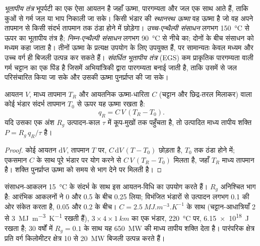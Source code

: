 \begin{definition}[भूतापीय तंत्र, स्थानस्थ ऊष्मा, एन्थैल्पी वर्ग, EGS]\label{def:b2:energy-geology:geothermal}
\emph{भूतापीय तंत्र} भूपर्पटी का एक ऐसा आयतन है जहाँ ऊष्मा,
पारगम्यता और जल एक साथ आते हैं, ताकि कुओं से गर्म जल या भाप निकाली जा सके। किसी भंडार की
\emph{स्थानस्थ ऊष्मा} वह ऊष्मा है जो वह अपने तापमान से किसी संदर्भ तापमान तक ठंडा होने
में छोड़ेगा। \emph{उच्च-एन्थैल्पी संसाधन}
लगभग \qty{150}{\celsius} से ऊपर का भूतापीय तंत्र है; \emph{निम्न-एन्थैल्पी
संसाधन} लगभग \qty{90}{\celsius} से नीचे का; दोनों के बीच
संसाधन को मध्यम कहा जाता है। तीनों ऊष्मा के प्रत्यक्ष उपयोग के लिए उपयुक्त हैं, पर सामान्यतः केवल मध्यम
और उच्च वर्ग ही बिजली उत्पन्न कर सकते हैं। \emph{संवर्धित भूतापीय तंत्र} (EGS)
कम प्राकृतिक पारगम्यता वाली गर्म चट्टान का एक पिंड है जिसमें अभियांत्रिकी द्वारा पारगम्यता बनाई जाती है, ताकि
उसमें से जल परिसंचारित किया जा सके और उसकी ऊष्मा पुनर्प्राप्त की जा सके।
\end{definition}

\begin{proposition}[स्थानस्थ ऊष्मा और पुनर्प्राप्य शक्ति]\label{prop:b2:energy-geology:heat}
आयतन $V$, माध्य तापमान $T_R$ और आयतनिक ऊष्मा-धारिता $C$ (चट्टान और छिद्र-तरल
मिलाकर) वाला कोई भंडार संदर्भ तापमान $T_0$ से ऊपर यह ऊष्मा रखता है:
\begin{equation}
q_R = C\,V\,(T_R - T_0) .
\label{eq:b2:energy-geology:heat}
\end{equation}
यदि उसका एक अंश $R_g$ उत्पादन-काल $\tau$ में कूप-मुखों तक पहुँचता है, तो उत्पादित माध्य तापीय
शक्ति $P = R_g\,q_R/\tau$ है।
\end{proposition}

\begin{proof}
कोई आयतन $\mathrm{d}V$, तापमान $T$ पर, $C\,\mathrm{d}V\,(T - T_0)$ छोड़ता है, $T_0$ तक ठंडा होने में;
एकसमान $C$ के साथ पूरे भंडार पर योग करने से $C\,V\,(T_R - T_0)$ मिलता है, जहाँ $T_R$ माध्य
तापमान है। शक्ति पुनर्प्राप्त ऊष्मा को समय से भाग देने पर मिलती है।
\end{proof}

संसाधन-आकलन \qty{15}{\celsius} के संदर्भ के साथ इस आयतन-विधि का उपयोग करते हैं।  $R_g$ अनिश्चित भाग है: आरंभिक आकलनों ने 0 और 0.5 के बीच 0.25 लिया; विभंजित भंडारों से
उत्पादन लगभग 0.1 की ओर संकेत करता है, 0.05 और 0.2 के बीच। $C = \qty{2.5}{MJ.m^{-3}.K^{-1}}$ के साथ
(चट्टान-आधात्रियाँ 2 से \qty{3}{MJ.m^{-3}.K^{-1}} रखती हैं), $3 \times 4 \times
\qty{1}{km}$ का एक भंडार, \qty{220}{\celsius} पर, \qty{6.15e18}{J} रखता है; 30 वर्षों में $R_g = 0.1$ के साथ यह
\qty{650}{MW} की माध्य तापीय शक्ति देता है। पारंपरिक क्षेत्र प्रति वर्ग किलोमीटर क्षेत्र 10 से
\qty{20}{MW} बिजली उत्पन्न करते हैं।


